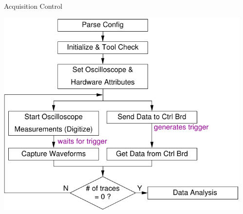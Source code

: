 \documentclass[final]{beamer}
\begin{document}
\begin{frame}[fragile]{}
\begin{columns}[t]
\begin{column}{.31\linewidth}
      \begin{block}{Acquisition Control}
        \begin{center}
          \includegraphics[scale=1.5]{../figures/data_acq}
        \end{center} 
       \end{block}
     
          
    \end{column}
   \begin{column}{.31\linewidth}
    

\end{column}
\end{columns}
\end{frame}
\end{document}
